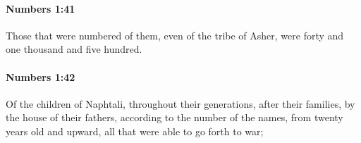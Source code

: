 		\paragraph{Numbers 1:41} %
			\label{NUMBERS-1-41}

			Those that were numbered of them, even of the tribe of Asher, were forty and one thousand and five hundred.


		\paragraph{Numbers 1:42} %
			\label{NUMBERS-1-42}

			Of the children of Naphtali, throughout their generations, after their families, by the house of their fathers, according to the number of the names, from twenty years old and upward, all that were able to go forth to war;



